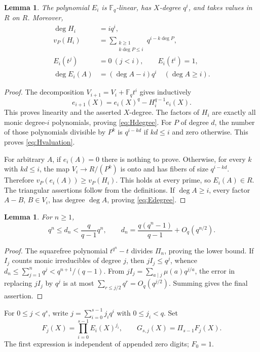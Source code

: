 \documentclass[11pt]{article}
\newtheorem{lemma}[theorem]{Lemma}
\newcommand{\F}{\mathbb F}
\begin{document}
\begin{lemma}\label{lem:carlitz}
The polynomial $E_i$ is $\F_q$-linear, has $X$-degree $q^i$, and takes
values in $R$ on $R$. Moreover,
\begin{align}
 \deg H_i&=iq^i,\label{eq:Hdegree}\\
 v_P(H_i)&=\sum_{\substack{k\ge1\\k\deg P\le i}}q^{i-k\deg P},
       \label{eq:Hvaluation}\\
 E_i(t^j)&=0\ (j<i),\qquad E_i(t^i)=1,\label{eq:triangular}\\
 \deg E_i(A)&=(\deg A-i)q^i\quad(\deg A\ge i).
       \label{eq:Edegree}
\end{align}
\end{lemma}
\begin{proof}
The decomposition $V_{i+1}=V_i+\F_qt^i$ gives inductively
\[
 e_{i+1}(X)=e_i(X)^q-H_i^{q-1}e_i(X).
\]
This proves linearity and the asserted $X$-degree. The factors of $H_i$
are exactly all monic degree-$i$ polynomials, proving \eqref{eq:Hdegree}.
For $P$ of degree $d$, the number of those polynomials divisible by
$P^k$ is $q^{i-kd}$ if $kd\le i$ and zero otherwise. This proves
\eqref{eq:Hvaluation}.

For arbitrary $A$, if $e_i(A)=0$ there is nothing to prove. Otherwise,
for every $k$ with $kd\le i$, the map $V_i\to R/(P^k)$ is onto and has
fibers of size $q^{i-kd}$. Therefore
$v_P(e_i(A))\ge v_P(H_i)$. This holds at every prime, so $E_i(A)\in R$.
The triangular assertions follow from the definitions. If $\deg A\ge i$,
every factor $A-B$, $B\in V_i$, has degree $\deg A$, proving
\eqref{eq:Edegree}.
\end{proof}

\begin{lemma}\label{lem:primecount}
For $n\ge1$,
\[
 q^n\le d_n<\frac q{q-1}q^n,
 \qquad
 d_n=\frac{q(q^n-1)}{q-1}+O_q(q^{n/2}).
\]
\end{lemma}
\begin{proof}
The squarefree polynomial $t^{q^n}-t$ divides $\Pi_n$, proving the lower
bound. If $I_j$ counts monic irreducibles of degree $j$, then
$jI_j\le q^j$, whence $d_n\le\sum_{j=1}^nq^j<q^{n+1}/(q-1)$.
From $jI_j=\sum_{a\mid j}\mu(a)q^{j/a}$, the error in replacing $jI_j$
by $q^j$ is at most $\sum_{r\le j/2}q^r=O_q(q^{j/2})$.
Summing gives the final assertion.
\end{proof}

For $0\le j<q^s$, write $j=\sum_{i=0}^{s-1}j_iq^i$ with $0\le j_i<q$.
Set
\begin{equation}\label{eq:digit}
 F_j(X)=\prod_{i=0}^{s-1}E_i(X)^{j_i},\qquad
 G_{s,j}(X)=\Pi_{s-1}F_j(X).
\end{equation}
The first expression is independent of appended zero digits; $F_0=1$.
\end{document}
